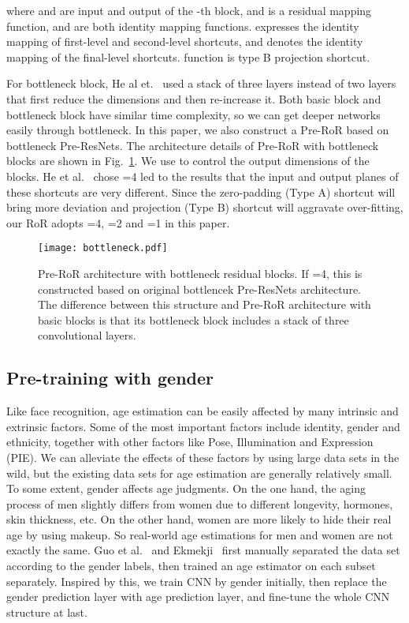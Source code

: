 \documentclass[journal]{IEEEtran}
\begin{document}
 
where  and  are input and output of the -th block, and  is a residual mapping function,  and  are both identity mapping functions.  expresses the identity mapping of first-level and second-level shortcuts, and  denotes the identity mapping of the final-level shortcuts.  function is type B projection shortcut.
\par 

For bottleneck block, He al et.~\cite{he2016preresnets} used a stack of three layers instead of two layers that first reduce the dimensions and then re-increase it. Both basic block and bottleneck block have similar time complexity, so we can get deeper networks easily through bottleneck. In this paper, we also construct a Pre-RoR based on bottleneck Pre-ResNets. The architecture details of Pre-RoR with bottleneck blocks are shown in Fig.~\ref{fig:bottleneck}. We use  to control the output dimensions of the blocks. He et al.~\cite{he2016preresnets} chose =4 led to the results that the input and output planes of these shortcuts are very different. 
Since the zero-padding (Type A) shortcut will bring more deviation and projection (Type B) shortcut will aggravate over-fitting, our RoR adopts =4, =2 and =1 in this paper. 

\begin{figure}
\centering
\texttt{[image: bottleneck.pdf]}
\caption{Pre-RoR architecture with bottleneck residual blocks. If =4, this is constructed based on original bottlencek Pre-ResNets architecture. The difference between this structure and Pre-RoR architecture with basic blocks is that its bottleneck block includes a stack of three convolutional layers.}
\label{fig:Pre-RoRnetworks}
\label{fig:bottleneck}
\end{figure}


\subsection{Pre-training with gender}

Like face recognition, age estimation can be easily affected by many intrinsic and extrinsic factors. Some of the most important factors include identity, gender and ethnicity, together with other factors like Pose, Illumination and Expression (PIE). We can alleviate the effects of these factors by using large data sets in the wild, but the existing data sets for age estimation are generally relatively small. To some extent, gender affects age judgments. On the one hand, the aging process of men slightly differs from women due to different longevity, hormones, skin thickness, etc. On the other hand, women are more likely to hide their real age by using makeup. So real-world age estimations for men and women are not exactly the same. 
Guo et al.~\cite{AgeCCA} and Ekmekji~\cite{AgeEkmekji} first manually separated the data set according to the gender labels, then trained an age estimator on each subset separately. 
Inspired by this, we train CNN by gender initially, then replace the gender prediction layer with age prediction layer, and fine-tune the whole CNN structure at last. 
\end{document}
